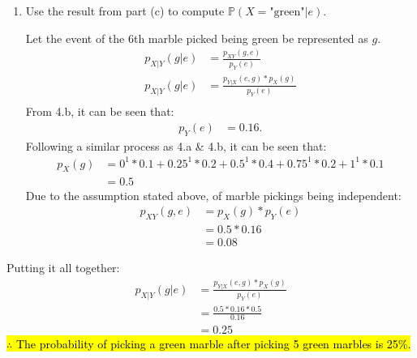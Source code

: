 \documentclass[11pt,onecolumn]{article}
\begin{document}
\begin{enumerate}
\begin{enumerate}
        \item Use the result from part (c) to compute $\mathbb{P}(X=\text{"green"} |e)$.
        \setlength{\parskip}{6pt}

        Let the event of the 6th marble picked being green be represented as $g$.
        \begin{equation}
            \begin{aligned}
                p_{X\vert Y}(g \vert e) & = \frac{p_{XY}(g,e)}{p_Y(e)} \\
                p_{X\vert Y}(g \vert e) & = \frac{p_{Y \vert X}(e,g)*p_X(g)}{p_Y(e)} \\
            \end{aligned}
        \end{equation}
        From 4.b, it can be seen that:
        \begin{equation}
            \begin{aligned}
                p_{Y}(e) & = 0.16. 
            \end{aligned}
        \end{equation}
        Following a similar process as 4.a \& 4.b, it can be seen that:
        \begin{equation}
            \begin{aligned}
                p_{X}(g) & = 0^1*0.1 + 0.25^1*0.2 +  0.5^1*0.4 + 0.75^1*0.2 + 1^1*0.1 \\
                & = 0.5
            \end{aligned}
        \end{equation}
        Due to the assumption stated above, of marble pickings being independent:
        \begin{equation}
            \begin{aligned}
                p_{XY}(g,e) & = p_X(g)*p_Y(e) \\
                & =  0.5*0.16 \\
                & = 0.08
            \end{aligned}
        \end{equation}
    \end{enumerate}
    Putting it all together:
    \begin{equation}
        \begin{aligned}
            p_{X\vert Y}(g \vert e) & = \frac{p_{Y \vert X}(e,g)*p_X(g)}{p_Y(e)} \\
            & = \frac{0.5*0.16*0.5}{0.16} \\
            & = 0.25
        \end{aligned}
    \end{equation}
    \hl{$\therefore$ The probability of picking a green marble after picking 5 green marbles is 25\%.}
\end{enumerate} 
\end{document}
